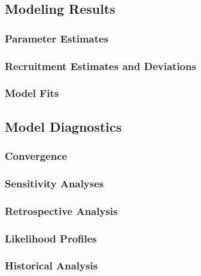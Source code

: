 \documentclass[
]{scrartcl}
\begin{document}
\newpage{}

\subsection{Modeling Results}\label{modeling-results}

\subsubsection{Parameter Estimates}\label{parameter-estimates}

\subsubsection{Recruitment Estimates and
Deviations}\label{recruitment-estimates-and-deviations}

\subsubsection{Model Fits}\label{model-fits}

\newpage{}

\subsection{Model Diagnostics}\label{model-diagnostics}

\subsubsection{Convergence}\label{convergence}

\subsubsection{Sensitivity Analyses}\label{sensitivity-analyses}

\subsubsection{Retrospective Analysis}\label{retrospective-analysis}

\subsubsection{Likelihood Profiles}\label{likelihood-profiles}

\subsubsection{Historical Analysis}\label{historical-analysis}
\end{document}
